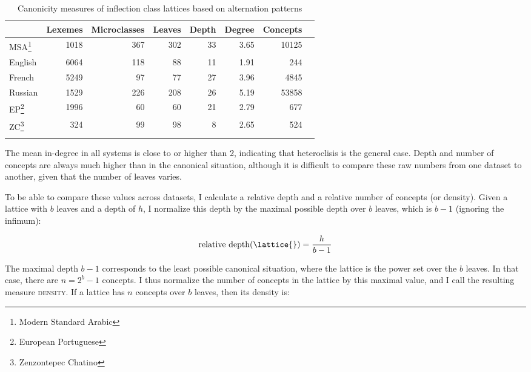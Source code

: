 \documentclass[output=paper]{langscibook}
\begin{document}
    \begin{table}
            \begin{tabular}{lrrrrrrr}
                \lsptoprule
                {} & Lexemes & Microclasses &  Leaves &  Depth &     Degree &  Concepts\\
                \midrule
                MSA\footnote{Modern Standard Arabic} &   1018 &    367 &   302 &       33 &  3.65 &   10125 \\
                English & 6064 & 118 &    88 &       11 &  1.91 &     244 \\
                French &  5249 &          97 &    77 &       27 &  3.96 &    4845 \\
                Russian &  1529 & 226 &   208 &       26 &  5.19 &   53858 \\
                EP\footnote{European Portuguese} & 1996 &60 &    60 &       21 &  2.79 &     677 \\
                ZC\footnote{Zenzontepec Chatino}  & 324 &       99 &    98 &        8 &  2.65 &     524 \\
                \lspbottomrule
        \end{tabular}
        \caption{Canonicity measures of inflection class lattices based on alternation patterns}
        \label{tab:beniamine:CanonPats}
    \end{table}

    The mean in-degree in all systems is close to or higher than 2, indicating that heteroclisis is the general case. Depth and number of concepts are always much higher than in the canonical situation, although it is difficult to compare these raw numbers from one dataset to another, given that the number of leaves varies.


    To be able to compare these values across datasets, I calculate a relative depth and a relative number of concepts (or density). Given a lattice with $b$ leaves and a depth of $h$, I normalize this depth by the maximal possible depth over $b$ leaves, which is $b-1$ (ignoring the infimum):

    \begin{equation*}
    \text{relative depth}(\lattice{}) = \frac{h}{b-1}
    \end{equation*}

    The maximal depth $b-1$ corresponds to the least possible canonical situation, where the lattice is the power set over the $b$ leaves. In that case, there are ${n=2^{b}-1}$ concepts. I thus normalize the number of concepts in the lattice by this maximal value, and I call the resulting measure \textsc{density}. If a lattice \lattice{} has $n$ concepts over $b$ leaves, then its density is:
\end{document}
